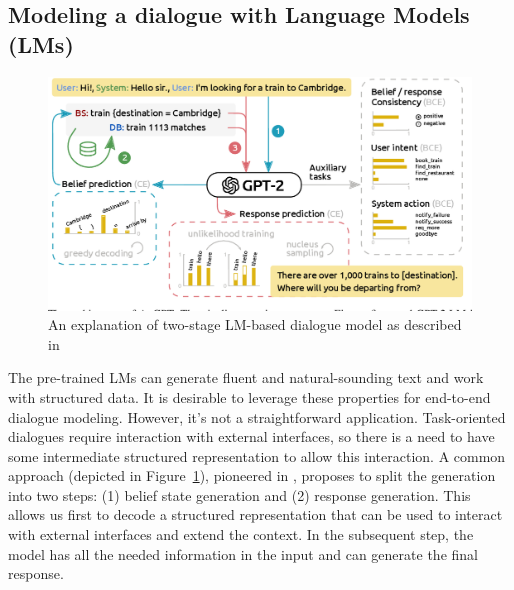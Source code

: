 \subsection{Modeling a dialogue with Language Models (LMs)}
\label{background:2stage-lm-modeling}
\begin{figure}[h]
    \centering
    \includegraphics[width=\textwidth]{images/augpt.png}
    \caption{An explanation of two-stage LM-based dialogue model as described in \citep{kulhanek-etal-2021-augpt}}
    \label{fig:augpt-2-stage}
\end{figure}
The pre-trained LMs can generate fluent and natural-sounding text and work with structured data.
It is desirable to leverage these properties for end-to-end dialogue modeling.
However, it's not a straightforward application.
Task-oriented dialogues require interaction with external interfaces, so there is a need to have some intermediate structured representation 
to allow this interaction.
A common approach (depicted in Figure~\ref{fig:augpt-2-stage}), pioneered in \citep{lei2018sequicity}, proposes to split the generation into two steps: (1) belief state generation and (2) response generation.
This allows us first to decode a structured representation that can be used to interact with external interfaces and extend the context.
In the subsequent step, the model has all the needed information in the input and can generate the final response.

